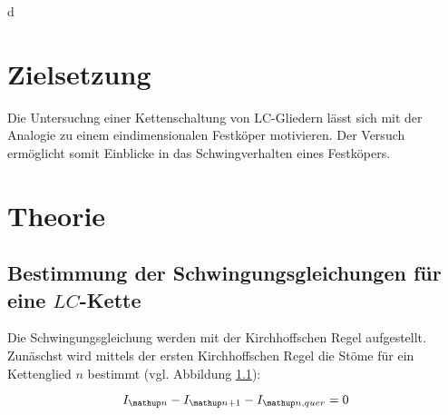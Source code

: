 d\setcounter{page}{1}
\section*{Zielsetzung}
Die Untersuchng einer Kettenschaltung von LC-Gliedern lässt sich mit der Analogie  
zu einem eindimensionalen Festköper motivieren.
Der Versuch ermöglicht somit Einblicke in das Schwingverhalten eines 
Festköpers.

\section{Theorie}

\subsection{Bestimmung der Schwingungsgleichungen für eine $LC$-Kette}
Die Schwingungsgleichung werden mit der Kirchhoffschen Regel aufgestellt.
Zunäschst wird mittels der ersten Kirchhoffschen Regel die Stöme für ein Kettenglied $n$ 
bestimmt (vgl. Abbildung \ref{}):

\begin{equation}
\label{eq:kircheins_lc}
I\ua{n}-I\ua{n+1}-I\ua{n,quer}=0
\end{equation}
